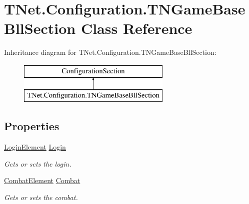 \hypertarget{class_t_net_1_1_configuration_1_1_t_n_game_base_bll_section}{}\section{T\+Net.\+Configuration.\+T\+N\+Game\+Base\+Bll\+Section Class Reference}
\label{class_t_net_1_1_configuration_1_1_t_n_game_base_bll_section}
Inheritance diagram for T\+Net.\+Configuration.\+T\+N\+Game\+Base\+Bll\+Section\+:\begin{figure}[H]
\begin{center}
\leavevmode
\includegraphics[height=2.000000cm]{class_t_net_1_1_configuration_1_1_t_n_game_base_bll_section}
\end{center}
\end{figure}
\subsection*{Properties}
\begin{DoxyCompactItemize}
\item 
\mbox{\hyperlink{class_t_net_1_1_configuration_1_1_login_element}{Login\+Element}} \mbox{\hyperlink{class_t_net_1_1_configuration_1_1_t_n_game_base_bll_section_a5e77fb68ab93c1e78010aca0c99a832c}{Login}}
\begin{DoxyCompactList}\small\item\em Gets or sets the login. \end{DoxyCompactList}\item 
\mbox{\hyperlink{class_t_net_1_1_configuration_1_1_combat_element}{Combat\+Element}} \mbox{\hyperlink{class_t_net_1_1_configuration_1_1_t_n_game_base_bll_section_a10a616b4218e4ea9e0271522eee15678}{Combat}}
\begin{DoxyCompactList}\small\item\em Gets or sets the combat. \end{DoxyCompactList}\end{DoxyCompactItemize}


